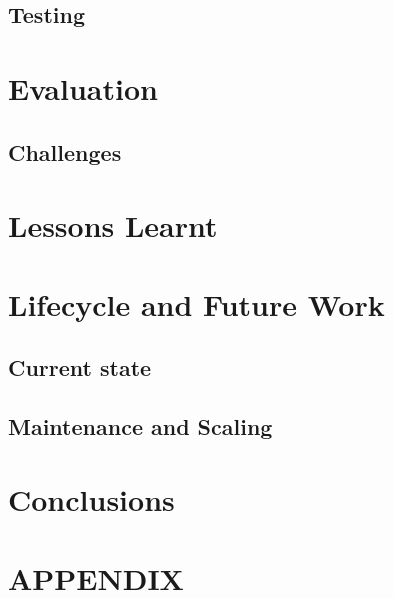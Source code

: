 \documentclass[prodmode,acmtecs]{acmsmall} %
\begin{document}
\subsection{Testing}

\section{Evaluation}

\subsection{Challenges}

\section{Lessons Learnt}

\section{Lifecycle and Future Work}
\subsection{Current state}

\subsection{Maintenance and Scaling}


\section{Conclusions}


\appendix
\section*{APPENDIX}
\setcounter{section}{1}
\end{document}
